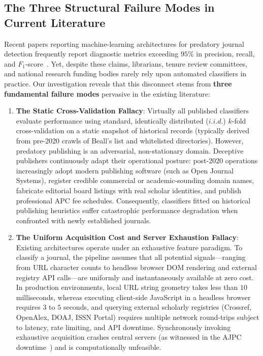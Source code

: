 \documentclass[journal]{IEEEtran}
\begin{document}
\subsection{The Three Structural Failure Modes in Current Literature}
Recent papers reporting machine-learning architectures for predatory journal detection frequently report diagnostic metrics exceeding $95\%$ in precision, recall, and $F_1$-score~\cite{chen2023open}. Yet, despite these claims, librarians, tenure review committees, and national research funding bodies rarely rely upon automated classifiers in practice. Our investigation reveals that this disconnect stems from \textbf{three fundamental failure modes} pervasive in the existing literature:

\begin{enumerate}
    \item \textbf{The Static Cross-Validation Fallacy}: Virtually all published classifiers evaluate performance using standard, identically distributed ($i.i.d.$) $k$-fold cross-validation on a static snapshot of historical records (typically derived from pre-2020 crawls of Beall's list and whitelisted directories). However, predatory publishing is an adversarial, non-stationary domain. Deceptive publishers continuously adapt their operational posture: post-2020 operations increasingly adopt modern publishing software (such as Open Journal Systems), register credible commercial or academic-sounding domain names, fabricate editorial board listings with real scholar identities, and publish professional APC fee schedules. Consequently, classifiers fitted on historical publishing heuristics suffer catastrophic performance degradation when confronted with newly established journals.
    \item \textbf{The Uniform Acquisition Cost and Server Exhaustion Fallacy}: Existing architectures operate under an exhaustive feature paradigm. To classify a journal, the pipeline assumes that all potential signals---ranging from URL character counts to headless browser DOM rendering and external registry API calls---are uniformly and instantaneously available at zero cost. In production environments, local URL string geometry takes less than $10$ milliseconds, whereas executing client-side JavaScript in a headless browser requires $3$ to $5$ seconds, and querying external scholarly registries (Crossref, OpenAlex, DOAJ, ISSN Portal) requires multiple network round-trips subject to latency, rate limiting, and API downtime. Synchronously invoking exhaustive acquisition crashes central servers (as witnessed in the AJPC downtime~\cite{teixeira2025variation}) and is computationally unfeasible.

\end{enumerate}
\end{document}
